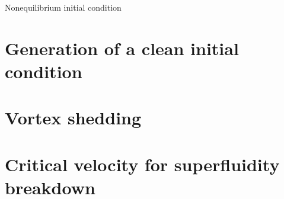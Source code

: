 \begin{chapter}{\label{cha:nonequib}Nonequilibrium initial condition}
\section{\label{section:cleanIC} Generation of a clean initial condition}
\section{\label{section:vortexshedding} Vortex shedding}
\section{\label{section:critvel} Critical velocity for superfluidity breakdown}
\end{chapter}
